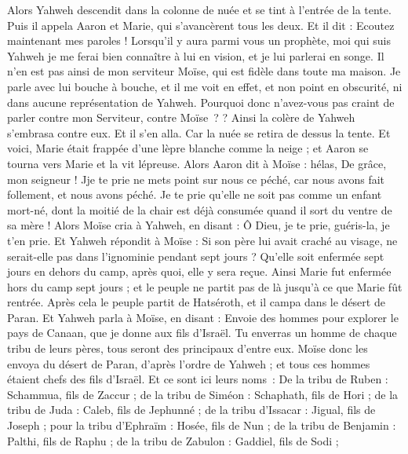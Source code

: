 \begin{multicols}{2}
Alors Yahweh descendit dans la colonne de nuée et se tint à l'entrée de la tente. Puis il appela Aaron et Marie, qui s'avancèrent tous les deux.
Et il dit : Ecoutez maintenant mes paroles ! Lorsqu'il y aura parmi vous un prophète, moi qui suis Yahweh je me ferai bien connaître à lui en vision, et je lui parlerai en songe.
Il n'en est pas ainsi de mon serviteur Moïse, qui est fidèle dans toute ma maison.
Je parle avec lui bouche à bouche, et il me voit en effet, et non point en obscurité, ni dans aucune représentation de Yahweh. Pourquoi donc n’avez-vous pas craint de parler contre mon Serviteur, contre Moïse ?
 ?
Ainsi la colère de Yahweh s'embrasa contre eux. Et il s'en alla.
Car la nuée se retira de dessus la tente. Et voici, Marie était frappée d'une lèpre blanche comme la neige ; et Aaron se tourna vers Marie et la vit lépreuse.
Alors Aaron dit à Moïse : hélas, De grâce, mon seigneur ! Jje te prie ne mets point sur nous ce péché, car nous avons fait follement, et nous avons péché.
Je te prie qu'elle ne soit pas comme un enfant mort-né, dont la moitié de la chair est déjà consumée quand il sort du ventre de sa mère !
Alors Moïse cria à Yahweh, en disant : Ô Dieu, je te prie, guéris-la, je t’en prie.
Et Yahweh répondit à Moïse : Si son père lui avait craché au visage, ne serait-elle pas dans l'ignominie pendant sept jours ? Qu'elle soit enfermée sept jours en dehors du camp, après quoi, elle y sera reçue.
Ainsi Marie fut enfermée hors du camp sept jours ; et le peuple ne partit pas de là jusqu'à ce que Marie fût rentrée.
Après cela le peuple partit de Hatséroth, et il campa dans le désert de Paran.
\VerseOne{}Et Yahweh parla à Moïse, en disant :
Envoie des hommes pour explorer le pays de Canaan, que je donne aux fils d'Israël. Tu enverras un homme de chaque tribu de leurs pères, tous seront des principaux d'entre eux.
Moïse donc les envoya du désert de Paran, d'après l'ordre de Yahweh ; et tous ces hommes étaient chefs des fils d'Israël.
Et ce sont ici leurs noms : De la tribu de Ruben : Schammua, fils de Zaccur ;
de la tribu de Siméon : Schaphath, fils de Hori ;
de la tribu de Juda : Caleb, fils de Jephunné ;
de la tribu d'Issacar : Jigual, fils de Joseph ;
pour la tribu d'Ephraïm : Hosée, fils de Nun ;
de la tribu de Benjamin : Palthi, fils de Raphu ;
de la tribu de Zabulon : Gaddiel, fils de Sodi ;

\end{multicols}
